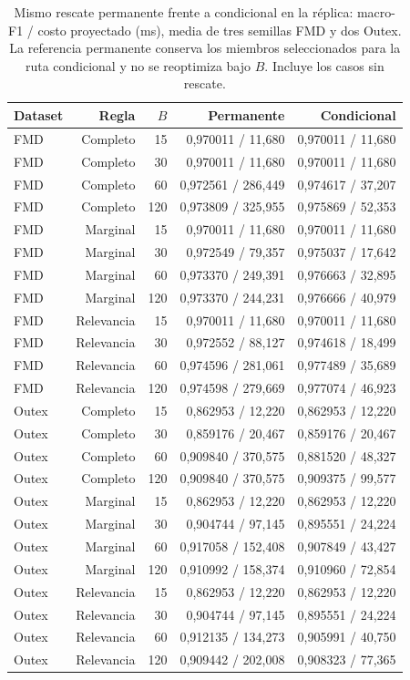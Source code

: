 \begin{table}[!htbp]\centering\fontsize{8}{10}\selectfont\setlength{\tabcolsep}{3pt}
\caption{Mismo rescate permanente frente a condicional en la réplica: macro-F1 / costo proyectado (ms), media de tres semillas FMD y dos Outex. La referencia permanente conserva los miembros seleccionados para la ruta condicional y no se reoptimiza bajo $B$. Incluye los casos sin rescate.}
\label{tab:replica-p0}
\begin{tabular}{@{}lrrrr@{}}
\toprule
Dataset & Regla & $B$ & Permanente & Condicional\\
\midrule
FMD & Completo & 15 & 0,970011 / 11,680 & 0,970011 / 11,680\\
FMD & Completo & 30 & 0,970011 / 11,680 & 0,970011 / 11,680\\
FMD & Completo & 60 & 0,972561 / 286,449 & 0,974617 / 37,207\\
FMD & Completo & 120 & 0,973809 / 325,955 & 0,975869 / 52,353\\
FMD & Marginal & 15 & 0,970011 / 11,680 & 0,970011 / 11,680\\
FMD & Marginal & 30 & 0,972549 / 79,357 & 0,975037 / 17,642\\
FMD & Marginal & 60 & 0,973370 / 249,391 & 0,976663 / 32,895\\
FMD & Marginal & 120 & 0,973370 / 244,231 & 0,976666 / 40,979\\
FMD & Relevancia & 15 & 0,970011 / 11,680 & 0,970011 / 11,680\\
FMD & Relevancia & 30 & 0,972552 / 88,127 & 0,974618 / 18,499\\
FMD & Relevancia & 60 & 0,974596 / 281,061 & 0,977489 / 35,689\\
FMD & Relevancia & 120 & 0,974598 / 279,669 & 0,977074 / 46,923\\
Outex & Completo & 15 & 0,862953 / 12,220 & 0,862953 / 12,220\\
Outex & Completo & 30 & 0,859176 / 20,467 & 0,859176 / 20,467\\
Outex & Completo & 60 & 0,909840 / 370,575 & 0,881520 / 48,327\\
Outex & Completo & 120 & 0,909840 / 370,575 & 0,909375 / 99,577\\
Outex & Marginal & 15 & 0,862953 / 12,220 & 0,862953 / 12,220\\
Outex & Marginal & 30 & 0,904744 / 97,145 & 0,895551 / 24,224\\
Outex & Marginal & 60 & 0,917058 / 152,408 & 0,907849 / 43,427\\
Outex & Marginal & 120 & 0,910992 / 158,374 & 0,910960 / 72,854\\
Outex & Relevancia & 15 & 0,862953 / 12,220 & 0,862953 / 12,220\\
Outex & Relevancia & 30 & 0,904744 / 97,145 & 0,895551 / 24,224\\
Outex & Relevancia & 60 & 0,912135 / 134,273 & 0,905991 / 40,750\\
Outex & Relevancia & 120 & 0,909442 / 202,008 & 0,908323 / 77,365\\
\bottomrule
\end{tabular}
\end{table}

